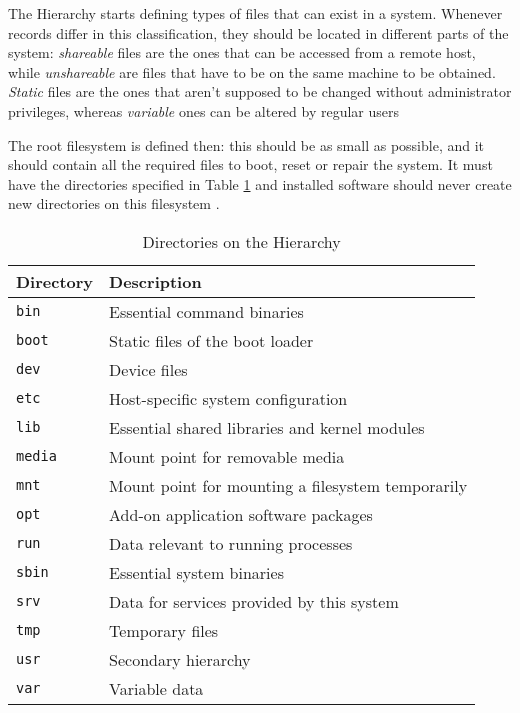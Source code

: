 The Hierarchy starts defining types of files that can exist in a system. Whenever records differ in this classification, they should be located in different parts of the system: \textit{shareable} files are the ones that can be accessed from a remote host, while \textit{unshareable} are files that have to be on the same machine to be obtained. \textit{Static} files are the ones that aren't supposed to be changed without administrator privileges, whereas \textit{variable} ones can be altered by regular users \cite{bandel2001special}

The root filesystem is defined then: this should be as small as possible, and it should contain all the required files to boot, reset or repair the system. It must have the directories specified in Table \ref{tab:directories} and installed software should never create new directories on this filesystem \cite{allbery2015filesystem}.


\begin{table}[h!]
\centering
\caption{Directories on the Hierarchy \cite{allbery2015filesystem}}
\label{tab:directories}
\begin{tabular}{ll}
\toprule
\textbf{Directory} & \textbf{Description} \\
\midrule
\texttt{bin} & Essential command binaries \\
\texttt{boot} & Static files of the boot loader \\
\texttt{dev} & Device files \\
\texttt{etc} & Host-specific system configuration \\
\texttt{lib} & Essential shared libraries and kernel modules \\
\texttt{media} & Mount point for removable media \\
\texttt{mnt} & Mount point for mounting a filesystem temporarily \\
\texttt{opt} & Add-on application software packages \\
\texttt{run} & Data relevant to running processes \\
\texttt{sbin} & Essential system binaries \\
\texttt{srv} & Data for services provided by this system \\
\texttt{tmp} & Temporary files \\
\texttt{usr} & Secondary hierarchy \\
\texttt{var} & Variable data \\
\bottomrule
\end{tabular}
\end{table}


